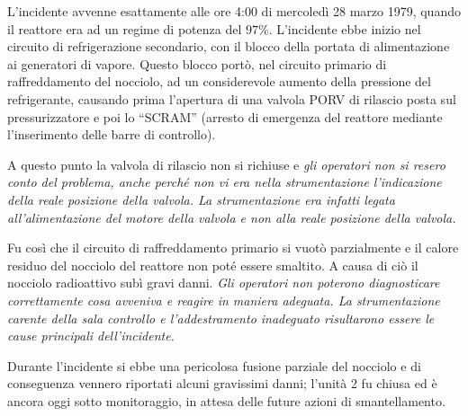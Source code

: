 L'incidente avvenne esattamente alle ore 4:00 di mercoledì 28 marzo 1979, quando il reattore era ad un regime di potenza del $97\%$. L'incidente ebbe inizio nel circuito di refrigerazione secondario, con il blocco della portata di alimentazione ai generatori di vapore. Questo blocco portò, nel circuito primario di raffreddamento del nocciolo, ad un considerevole aumento della pressione del refrigerante, causando prima l'apertura di una valvola PORV di rilascio posta sul pressurizzatore e poi lo ``SCRAM'' (arresto di emergenza del reattore mediante l'inserimento delle barre di controllo). 

A questo punto la valvola di rilascio non si richiuse e \emph{gli operatori non si resero conto del problema, anche perché non vi era nella strumentazione l'indicazione della reale posizione della valvola. La strumentazione era infatti legata all'alimentazione del motore della valvola e non alla reale posizione della valvola.}

Fu così che il circuito di raffreddamento primario si vuotò parzialmente e il calore residuo del nocciolo del reattore non poté essere smaltito. A causa di ciò il nocciolo radioattivo subì gravi danni. \emph{Gli operatori non poterono diagnosticare correttamente cosa avveniva e reagire in maniera adeguata. La strumentazione carente della sala controllo e l'addestramento inadeguato risultarono essere le cause principali dell'incidente.}

Durante l'incidente si ebbe una pericolosa fusione parziale del nocciolo e di conseguenza vennero riportati alcuni gravissimi danni; l'unità 2 fu chiusa ed è ancora oggi sotto monitoraggio, in attesa delle future azioni di smantellamento.


